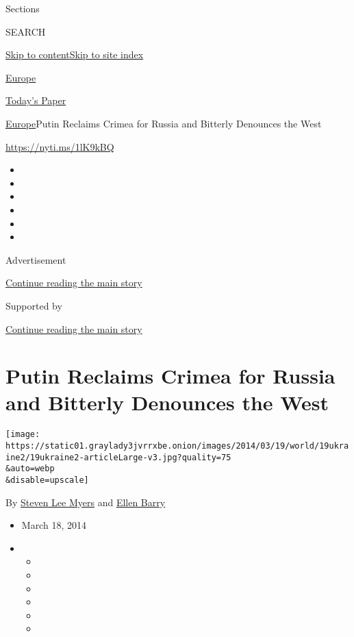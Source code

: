 Sections

SEARCH

\protect\hyperlink{site-content}{Skip to
content}\protect\hyperlink{site-index}{Skip to site index}

\href{https://www.nytimes3xbfgragh.onion/section/world/europe}{Europe}

\href{https://myaccount.nytimes3xbfgragh.onion/auth/login?response_type=cookie\&client_id=vi}{}

\href{https://www.nytimes3xbfgragh.onion/section/todayspaper}{Today's
Paper}

\href{/section/world/europe}{Europe}\textbar{}Putin Reclaims Crimea for
Russia and Bitterly Denounces the West

\url{https://nyti.ms/1lK9kBQ}

\begin{itemize}
\item
\item
\item
\item
\item
\item
\end{itemize}

Advertisement

\protect\hyperlink{after-top}{Continue reading the main story}

Supported by

\protect\hyperlink{after-sponsor}{Continue reading the main story}

\hypertarget{putin-reclaims-crimea-for-russia-and-bitterly-denounces-the-west}{%
\section{Putin Reclaims Crimea for Russia and Bitterly Denounces the
West}\label{putin-reclaims-crimea-for-russia-and-bitterly-denounces-the-west}}

\texttt{[image: https://static01.graylady3jvrrxbe.onion/images/2014/03/19/world/19ukraine2/19ukraine2-articleLarge-v3.jpg?quality=75\\\&auto=webp\\\&disable=upscale]}

By \href{http://www.nytimes3xbfgragh.onion/by/steven-lee-myers}{Steven
Lee Myers} and
\href{https://www.nytimes3xbfgragh.onion/by/ellen-barry}{Ellen Barry}

\begin{itemize}
\item
  March 18, 2014
\item
  \begin{itemize}
  \item
  \item
  \item
  \item
  \item
  \item
  \end{itemize}
\end{itemize}


